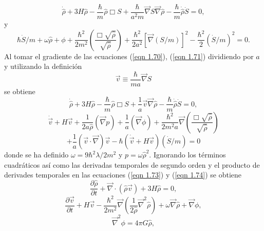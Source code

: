 \documentclass[a4paper,openright,10pt, oneside, final]{book}
\begin{document}
\begin{equation}
\dot{\hat{\rho}} + 3H\hat{\rho}
-\frac{\hbar}{m}\hat{\rho}\Box S 
+\frac{\hbar}{a^{2}m}\vec{\nabla}S\vec{\nabla}\hat{\rho}
-\frac{\hbar}{m}\dot{\hat{\rho}}\dot{S}=0,\label{eqn 1.70}
\end{equation}
y
\begin{equation}
\hbar \dot{S}/m + \omega\hat{\rho}
+ \phi
+ \frac{\hbar^{2}}{2m^{2}}\left(\frac{\Box\sqrt{\hat{\rho}}}{\sqrt{\hat{\rho}}}\right)
+ \frac{\hbar^{2}}{2a^{2}}[\vec{\nabla}(S/m)]^{2}
- \frac{\hbar^{2}}{2}(\dot{S}/m)^{2} = 0.\label{eqn 1.71}
\end{equation}
Al tomar el gradiente de las ecuaciones (\ref{eqn 1.70}), (\ref{eqn 1.71}) dividiendo por $a$ y utilizando la definición 
\begin{equation}
\vec{v}\equiv \frac{\hbar}{ma}\vec{\nabla}S\label{eqn 1.72}
\end{equation}
se obtiene
\begin{equation}
\dot{\hat{\rho}} + 3H\hat{\rho} - \frac{\hbar}{m}\hat{\rho}\Box S 
+ \frac{1}{a}\vec{v}\vec{\nabla}\hat{\rho} - \frac{\hbar}{m}\dot{\hat{\rho}}\dot{S} = 0,\label{eqn 1.73}
\end{equation}
\begin{equation*}
\dot{\vec{v}} + H\vec{v} + \frac{1}{2a\hat{\rho}}(\vec{\nabla}p) 
+ \frac{1}{a}(\vec{\nabla}\phi) + \frac{\hbar^{2}}{2m^{2}a}\vec{\nabla}
\left(\frac{\Box\sqrt{\hat{\rho}}}{\sqrt{\hat{\rho}}}\right) 
\end{equation*}  
\begin{equation}
+\frac{1}{a}(\vec{v}\cdot\vec{\nabla})\vec{v}-\hbar(\dot{\vec{v}}+H\vec{v})(\dot{S}/m) = 0\label{eqn 1.74}
\end{equation}
donde se ha definido $\omega = 9\hbar^{2}\lambda/2m^{2}$ y $p= \omega\hat{ \rho}^{2}$. 
Ignorando los términos cuadráticos así como las derivadas temporales de segundo orden y el producto de derivades temporales en las ecuaciones (\ref{eqn 1.73}) y (\ref{eqn 1.74}) se obtiene
\begin{equation}
\frac{\partial \hat{\rho}}{\partial t} +
\vec{\nabla}\cdot(\hat{\rho} \vec{v}) + 3H\hat{\rho}=0,\label{eqn 1.75}
\end{equation}
\begin{equation}
\frac{\partial \vec{v}}{\partial t} + H \vec{v}
-\frac{\hbar^{2}}{2m^{2}}\vec{\nabla}\left(\frac{1}{2\hat{\rho}}\vec{\nabla}^{2}\hat{\rho}\right) + \omega\vec{\nabla}\hat{\rho} +\vec{\nabla}\phi,\label{eqn 1.76}
\end{equation}
\begin{equation}
\vec{\nabla}^{2}\phi = 4\pi G\hat{\rho},\label{eqn 1.77}
\end{equation}
\end{document}
